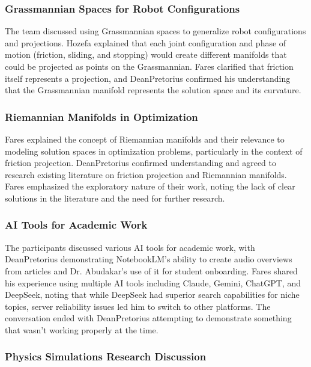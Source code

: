 \subsubsection{Grassmannian Spaces for Robot Configurations}

The team discussed using Grassmannian spaces to generalize robot configurations and projections. Hozefa explained that each joint configuration and phase of motion (friction, sliding, and stopping) would create different manifolds that could be projected as points on the Grassmannian. Fares clarified that friction itself represents a projection, and DeanPretorius confirmed his understanding that the Grassmannian manifold represents the solution space and its curvature.

\subsubsection{Riemannian Manifolds in Optimization}

Fares explained the concept of Riemannian manifolds and their relevance to modeling solution spaces in optimization problems, particularly in the context of friction projection. DeanPretorius confirmed understanding and agreed to research existing literature on friction projection and Riemannian manifolds. Fares emphasized the exploratory nature of their work, noting the lack of clear solutions in the literature and the need for further research.

\subsubsection{AI Tools for Academic Work}

The participants discussed various AI tools for academic work, with DeanPretorius demonstrating NotebookLM's ability to create audio overviews from articles and Dr. Abudakar's use of it for student onboarding. Fares shared his experience using multiple AI tools including Claude, Gemini, ChatGPT, and DeepSeek, noting that while DeepSeek had superior search capabilities for niche topics, server reliability issues led him to switch to other platforms. The conversation ended with DeanPretorius attempting to demonstrate something that wasn't working properly at the time.

\subsubsection{Physics Simulations Research Discussion}

